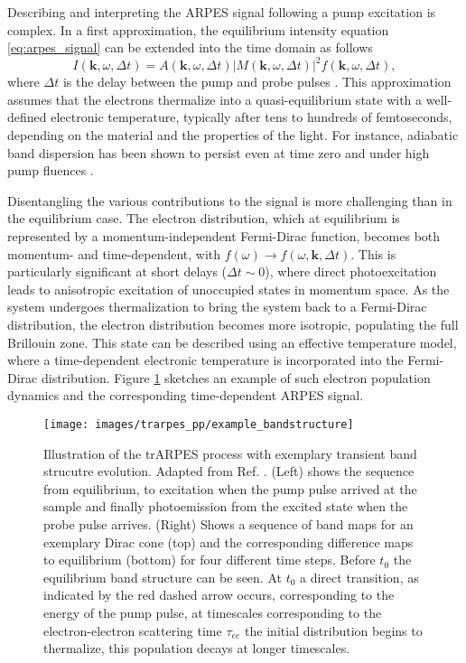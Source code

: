 Describing and interpreting the ARPES signal following a pump excitation is complex.
In a first approximation, the equilibrium intensity equation \ref{eq:arpes_signal} can be extended into the time domain as follows
\begin{equation}
	I(\mathbf{k}, \omega, \Delta t) = A(\mathbf{k}, \omega, \Delta t)\left|M(\mathbf{k}, \omega, \Delta t)\right|^2f(\mathbf{k}, \omega, \Delta t),
\end{equation}
where $\Delta t$ is the delay between the pump and probe pulses \cite{freericks_what_2021}.
This approximation assumes that the electrons thermalize into a quasi-equilibrium state with a well-defined electronic temperature, typically after tens to hundreds of femtoseconds, depending on the material and the properties of the light.
For instance, adiabatic band dispersion has been shown to persist even at time zero and under high pump fluences \cite{boschini_time-resolved_2024,neufeld_time-_2022}.

Disentangling the various contributions to the signal is more challenging than in the equilibrium case.
The electron distribution, which at equilibrium is represented by a momentum-independent Fermi-Dirac function, becomes both momentum- and time-dependent, with $f(\omega) \rightarrow f(\omega, \mathbf{k}, \Delta t)$.
This is particularly significant at short delays ($\Delta t \sim 0$), where direct photoexcitation leads to anisotropic excitation of unoccupied states in momentum space.
As the system undergoes thermalization to bring the system back to a Fermi-Dirac distribution, the electron distribution becomes more isotropic, populating the full Brillouin zone.
This state can be described using an effective temperature model, where a time-dependent electronic temperature is incorporated into the Fermi-Dirac distribution.
Figure \ref{fig:example_bandstructure} sketches an example of such electron population dynamics and the corresponding time-dependent ARPES signal.

\begin{figure}
	\centering
	\texttt{[image: images/trarpes\_pp/example\_bandstructure]}
	\caption{Illustration of the trARPES process with exemplary transient band strucutre evolution. Adapted from Ref. \cite{boschini_time-resolved_2024}. (Left) shows the sequence from equilibrium, to excitation when the pump pulse arrived at the sample and finally photoemission from the excited state when the probe pulse arrives. (Right) Shows a sequence of band maps for an exemplary Dirac cone (top) and the corresponding difference maps to equilibrium (bottom) for four different time steps. Before $t_0$ the equilibrium band structure can be seen. At $t_0$ a direct transition, as indicated by the red dashed arrow occurs, corresponding to the energy of the pump pulse, at timescales corresponding to the electron-electron scattering time $\tau_{ee}$ the initial distribution begins to thermalize, this population decays at longer timescales.}
	\label{fig:example_bandstructure}
\end{figure}


